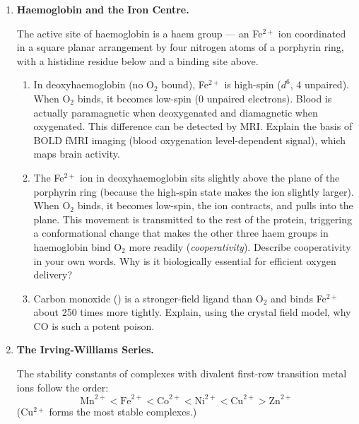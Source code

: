 \documentclass[12pt, a4paper]{book}
\newcommand{\newterm}[1]{\textit{\textcolor{DiscoveryColor}{#1}}}
\begin{document}
\begin{deepbox}
\begin{enumerate}[label=\textbf{D\arabic*.}]

  \item \textbf{Haemoglobin and the Iron Centre.}

        The active site of haemoglobin is a haem group ---
        an Fe$^{2+}$ ion coordinated in a square planar
        arrangement by four nitrogen atoms of a porphyrin ring,
        with a histidine residue below and a binding site above.

        \begin{enumerate}[label=(\alph*)]
          \item In deoxyhaemoglobin (no O$_2$ bound),
                Fe$^{2+}$ is high-spin ($d^6$, 4 unpaired).
                When O$_2$ binds, it becomes low-spin
                (0 unpaired electrons).
                Blood is actually paramagnetic when deoxygenated
                and diamagnetic when oxygenated.
                This difference can be detected by MRI.
                Explain the basis of BOLD fMRI imaging
                (blood oxygenation level-dependent signal),
                which maps brain activity.
          \item The Fe$^{2+}$ ion in deoxyhaemoglobin sits
                slightly above the plane of the porphyrin ring
                (because the high-spin state makes the ion
                slightly larger).
                When O$_2$ binds, it becomes low-spin,
                the ion contracts, and pulls into the plane.
                This movement is transmitted to the rest
                of the protein, triggering a conformational
                change that makes the other three haem groups
                in haemoglobin bind O$_2$ more readily
                (\newterm{cooperativity}).
                Describe cooperativity in your own words.
                Why is it biologically essential for
                efficient oxygen delivery?
          \item Carbon monoxide () is a stronger-field
                ligand than O$_2$ and binds Fe$^{2+}$ about
                250 times more tightly.
                Explain, using the crystal field model,
                why CO is such a potent poison.
        \end{enumerate}

  \item \textbf{The Irving-Williams Series.}

        The stability constants of complexes with divalent
        first-row transition metal ions follow the order:
        \[
          \text{Mn}^{2+} < \text{Fe}^{2+} < \text{Co}^{2+} <
          \text{Ni}^{2+} < \text{Cu}^{2+} > \text{Zn}^{2+}
        \]
        (Cu$^{2+}$ forms the most stable complexes.)


\end{enumerate}
\end{deepbox}
\end{document}
